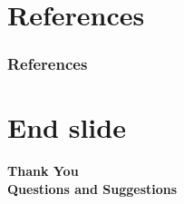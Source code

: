 \documentclass[aspectratio=169,t,xcolor=table]{beamer}
\begin{document}
\section{References}
\begin{frame}
	\frametitle{References}
	\nocite{*}
	
	\tiny
	
\end{frame}

\section{End slide}
\begin{frame}
	\centering
	\vspace{3.5cm}
	\textbf{\Huge Thank You } \\
	\vspace{1cm}
	\textbf{Questions and Suggestions}
\end{frame}
\end{document}
